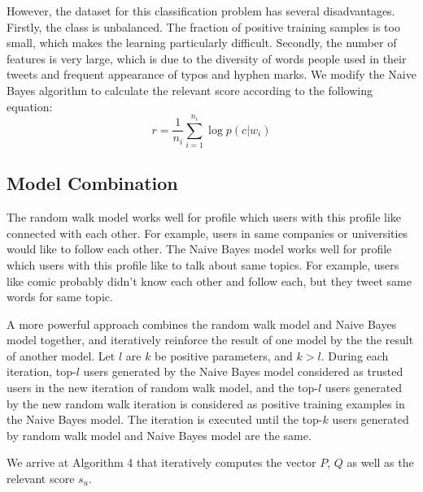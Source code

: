 \documentclass{article}
\begin{document}

However, the dataset for this classification problem has several disadvantages. Firstly, the class is unbalanced. The fraction of positive training samples is too small, which makes the learning particularly difficult. Secondly, the number of features is very large, which is due to the diversity of words people used in their tweets and frequent appearance of typos and hyphen marks. We modify the Naive Bayes algorithm to calculate the relevant score according to the following equation:
\begin{equation}
r = \frac{1}{n_i}\sum_{i=1}^{n_i} \log p(c|w_i)
\end{equation}

\subsection{Model Combination}

The random walk model works well for profile which users with this profile like connected with each other. For example, users in same companies or universities would like to follow each other. The Naive Bayes model works well for profile which users with this profile like to talk about same topics. For example, users like comic probably didn't know each other and follow each, but they tweet same words for same topic.

A more powerful approach combines the random walk model and Naive Bayes model together, and iteratively reinforce the result of one model by the the result of another model. Let $l$ are $k$ be positive parameters, and $k > l$. During each iteration, top-$l$ users generated by the Naive Bayes model considered as trusted users in the new iteration of random walk model, and the top-$l$ users generated by the new random walk iteration is considered as positive training examples in the Naive Bayes model. The iteration is executed until the top-$k$ users generated by random walk model and Naive Bayes model are the same.

We arrive at Algorithm 4 that iteratively computes the vector $P$, $Q$ as well as the relevant score $s_u$.

\ifx \allfiles \undefined
\end{document}
